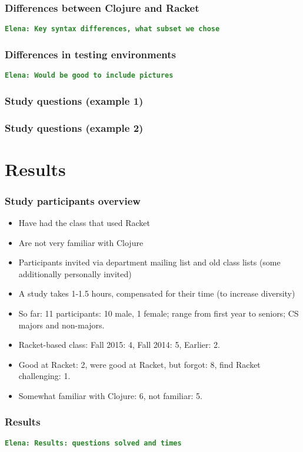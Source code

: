\documentclass{beamer}
\newcommand{\comment}[1]{{\bf \tt  {#1}}}
\newcommand{\emcomment}[1]{\textcolor{ForestGreen}{\comment{Elena: {#1}}}}
\begin{document}
\begin{frame}
\frametitle{ Differences between Clojure and Racket}
\emcomment{Key syntax differences, what subset we chose}
\end{frame}

\begin{frame}
\frametitle{ Differences in testing environments}
\emcomment{Would be good to include pictures}
\end{frame}

\begin{frame}
\frametitle{Study questions (example 1)}

\end{frame}

\begin{frame}
\frametitle{Study questions (example 2)}

\end{frame}

\section{Results}

\begin{frame}
\frametitle{Study participants overview}
\begin{itemize}
\item Have had the class that used Racket
\item Are not very familiar with Clojure 
\item Participants invited via department mailing list and old class lists (some additionally personally invited)
\item A study takes 1-1.5 hours, compensated for their time (to increase diversity)
\item So far: 11 participants: 10 male, 1 female; range from first year to seniors; CS majors and non-majors.  
\item Racket-based class: Fall 2015: 4, Fall 2014: 5, Earlier: 2. 
\item Good at Racket: 2, were good at Racket, but forgot: 8, find Racket challenging: 1.
\item Somewhat familiar with Clojure: 6, not familiar: 5.  
\end{itemize}
\end{frame}

\begin{frame}
\frametitle{Results}
\emcomment{Results: questions solved and times}
\end{frame}
\end{document}
